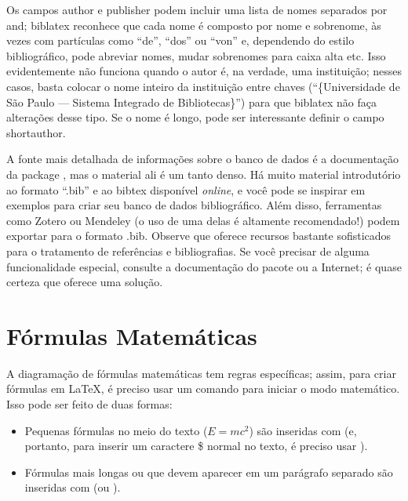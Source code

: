 Os campos \textsf{author} e \textsf{publisher} podem incluir uma lista
de nomes separados por \textsf{and}; biblatex reconhece que cada nome é
composto por nome e sobrenome, às vezes com partículas como ``de'', ``dos''
ou ``von'' e, dependendo do estilo bibliográfico, pode abreviar nomes, mudar
sobrenomes para caixa alta etc. Isso evidentemente não funciona quando o autor
é, na verdade, uma instituição; nesses casos, basta colocar o nome inteiro da
instituição entre chaves (``\{Universidade de São Paulo --- Sistema Integrado
de Bibliotecas\}'') para que biblatex não faça alterações desse tipo. Se o
nome é longo, pode ser interessante definir o campo \textsf{shortauthor}.

A fonte mais detalhada de informações sobre o banco de dados é a documentação
da package  \citep[em especial as seções 2.1.1 e 2.2.2]{biblatex},
mas o material ali é um tanto denso.
Há muito material introdutório ao formato ``.bib'' e ao bibtex disponível
\emph{online}, e você pode se inspirar em exemplos para criar seu banco de
dados bibliográfico. Além disso, ferramentas como Zotero ou
Mendeley (o uso de uma delas é altamente recomendado!)
podem exportar para o formato .bib. Observe que 
 oferece recursos bastante sofisticados para o tratamento de
referências e bibliografias. Se você precisar de alguma funcionalidade
especial, consulte a documentação do pacote ou a Internet; é quase certeza
que  oferece uma solução.


\section{Fórmulas Matemáticas}

\enlargethispage{-.5\baselineskip}

A diagramação de fórmulas matemáticas tem regras específicas; assim, para
criar fórmulas em \LaTeX{}, é preciso usar um comando para iniciar o modo
matemático. Isso pode ser feito de duas formas:

\begin{itemize}
  \item Pequenas fórmulas no meio do texto ($E=mc^2$) são inseridas com
   (e, portanto, para inserir um caractere \$
  normal no texto, é preciso usar \cmd{\sla{}\$}).

  \item Fórmulas mais longas ou que devem aparecer em um parágrafo
  separado são inseridas com  (ou
  ).
\end{itemize}

